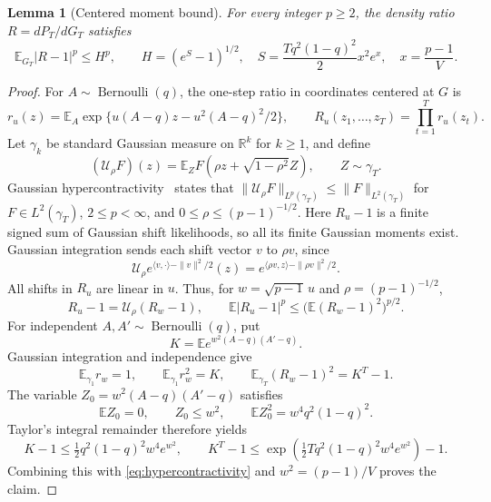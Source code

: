 \documentclass[11pt]{article}
\newtheorem{lemma}[theorem]{Lemma}
\newcommand{\R}{\mathbb R}
\newcommand{\E}{\mathbb E}
\begin{document}
\begin{lemma}[Centered moment bound]\label{lem:moment}
For every integer $p\ge2$, the density ratio
$R=dP_T/dG_T$ satisfies
\begin{equation}\label{eq:moment}
 \E_{G_T}|R-1|^p\le H^p,\qquad
 H=(e^S-1)^{1/2},\quad
 S=\frac{Tq^2(1-q)^2}{2}x^2e^x,\quad x=\frac{p-1}{V}.
\end{equation}
\end{lemma}
\begin{proof}
For $A\sim\operatorname{Bernoulli}(q)$, the one-step ratio in coordinates
centered at $G$ is
\[
 r_u(z)=\E_A\exp\{u(A-q)z-u^2(A-q)^2/2\},\qquad
 R_u(z_1,\ldots,z_T)=\prod_{t=1}^T r_u(z_t).
\]
Let $\gamma_k$ be standard Gaussian measure on $\R^k$ for $k\ge1$, and define
\[
 (\mathcal U_\rho F)(z)=\E_Z F(\rho z+\sqrt{1-\rho^2}Z),
 \qquad Z\sim\gamma_T.
\]
Gaussian hypercontractivity~\cite[p.~1062]{gross} states that
$\|\mathcal U_\rho F\|_{L^p(\gamma_T)}\le\|F\|_{L^2(\gamma_T)}$
for $F\in L^2(\gamma_T)$, $2\le p<\infty$, and $0\le\rho\le(p-1)^{-1/2}$.
Here $R_u-1$ is a finite signed sum of Gaussian shift likelihoods,
so all its finite Gaussian moments exist.
Gaussian integration sends each shift vector $v$ to $\rho v$, since
\[
 \mathcal U_\rho e^{\langle v,\cdot\rangle-\|v\|^2/2}(z)
 =e^{\langle\rho v,z\rangle-\|\rho v\|^2/2}.
\]
All shifts in $R_u$ are linear in $u$. Thus, for
$w=\sqrt{p-1}\,u$ and $\rho=(p-1)^{-1/2}$,
\begin{equation}\label{eq:hypercontractivity}
 R_u-1=\mathcal U_\rho(R_w-1),\qquad
 \E|R_u-1|^p\le\bigl(\E(R_w-1)^2\bigr)^{p/2}.
\end{equation}
For independent $A,A'\sim\operatorname{Bernoulli}(q)$, put
\[
 K=\E e^{w^2(A-q)(A'-q)}.
\]
Gaussian integration and independence give
\[
 \E_{\gamma_1}r_w=1,\qquad \E_{\gamma_1}r_w^2=K,\qquad
 \E_{\gamma_T}(R_w-1)^2=K^T-1.
\]
The variable $Z_0=w^2(A-q)(A'-q)$ satisfies
\[
 \E Z_0=0,\qquad Z_0\le w^2,\qquad
 \E Z_0^2=w^4q^2(1-q)^2.
\]
Taylor's integral remainder therefore yields
\[
 K-1\le\tfrac12q^2(1-q)^2w^4e^{w^2},\qquad
 K^T-1\le\exp\!\left(\tfrac12Tq^2(1-q)^2w^4e^{w^2}\right)-1.
\]
Combining this with \eqref{eq:hypercontractivity} and $w^2=(p-1)/V$
proves the claim.
\end{proof}
\end{document}

